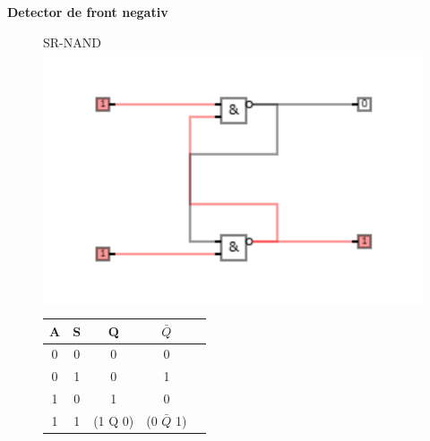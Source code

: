 \documentclass[12pt]{article}
\begin{document}
\begin{center}
    \large{\textbf{Detector de front negativ}}
\end{center}

\begin{figure}[h!]
    \begin{minipage}{0.45\textwidth}
        SR-NAND
        \includegraphics[scale=0.5]{Schema3.png}
    \end{minipage}
    \hfill
    \begin{minipage}{0.3\textwidth}
        \begin{tabular}{|c|c|c|c|c|}
            \hline
            A & S & Q & $\bar{Q}$ \\ \hline
            0 & 0 & 0 & 0 \\ \hline
            0 & 1 & 0 & 1 \\ \hline
            1 & 0 & 1 & 0 \\ \hline
            1 & 1 & (1 Q 0) & (0 $\bar{Q}$ 1) \\ \hline
        \end{tabular}
    \end{minipage}
\end{figure}
\end{document}
